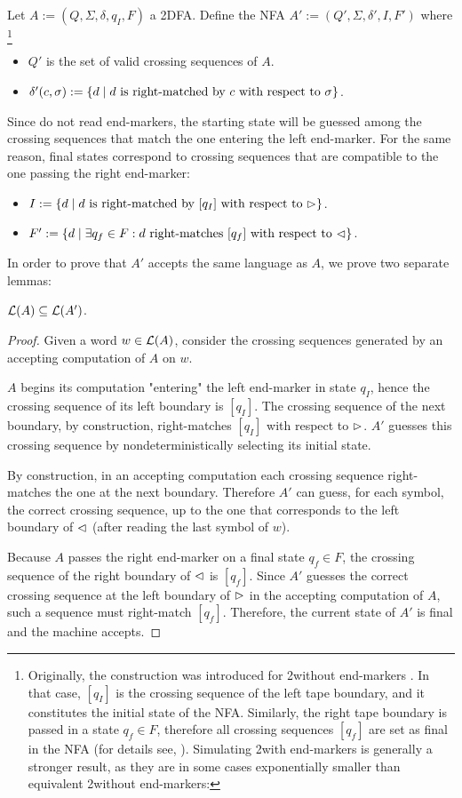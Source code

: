 Let $A:=(Q,\Sigma,\delta,q_I,F)$ a 2DFA.
Define the NFA $A':=(Q',\Sigma,\delta',I,F')$ where%
\footnote{ %
	Originally, the construction was introduced for 2\DFAs without end-markers \cite{RabSco59}.
	In that case, $[q_I]$ is the crossing sequence of the left tape boundary, and it constitutes the initial state of the NFA.
	Similarly, the right tape boundary is passed in a state $q_f\in F$, therefore all crossing sequences $[q_f]$ are set as final in the NFA (for details see, \eg[,] \cite{HopUll79}).
	Simulating 2\DFAs with end-markers is generally a stronger result, as they are in some cases exponentially smaller than equivalent 2\DFAs without end-markers:
}
\begin{itemize}
	\item $Q'$ is the set of valid crossing sequences of $A$.
	\item $\delta'(c,\sigma):=\{d \mid \text{$d$ is right-matched by $c$ with respect to~$\sigma$}\}$.
\end{itemize}
Since \NFAs do not read end-markers, the starting state will be guessed among the crossing sequences that match the one entering the left end-marker.
For the same reason, final states correspond to crossing sequences that are compatible to the one passing the right end-marker:
\begin{itemize}
	\item $I:=\{d\mid \text{$d$ is right-matched by $[q_I]$ with respect to $\rhd$}\}$.
	\item $F':=\{d\mid \exists q_f\in F: \text{$d$ right-matches $[q_f]$ with respect to $\lhd$}\}$.
\end{itemize}

In order to prove that $A'$ accepts the same language as $A$, we prove two separate lemmas:
\begin{lemm}\label{lem:2DFAto1NFA-1}
	$\mathcal L(A)\subseteq\mathcal L(A')$.
\end{lemm}
\begin{proof}
	Given a word $w\in\mathcal L(A)$, consider the crossing sequences generated by an accepting computation of $A$ on $w$.

	$A$ begins its computation "entering" the left end-marker in state $q_I$, hence the crossing sequence of its left boundary is $[q_I]$.
	The crossing sequence of the next boundary, by construction, right-matches $[q_I]$ with respect to $\rhd$.
	$A'$ guesses this crossing sequence by nondeterministically selecting its initial state.

	By construction, in an accepting computation each crossing sequence right-matches the one at the next boundary.
	Therefore $A'$ can guess, for each symbol, the correct crossing sequence, up to the one that corresponds to the left boundary of $\lhd$ (after reading the last symbol of $w$).

	Because $A$ passes the right end-marker on a final state $q_f\in F$, the crossing sequence of the right boundary of $\lhd$ is $[q_f]$.
	Since $A'$ guesses the correct crossing sequence at the left boundary of $\rhd$ in the accepting computation of $A$, such a sequence must right-match $[q_f]$.
	Therefore, the current state of $A'$ is final and the machine accepts.
\end{proof}


